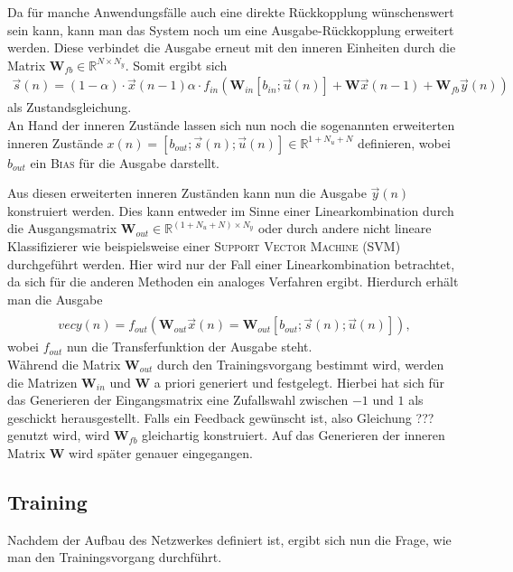 Da für manche Anwendungsfälle auch eine direkte Rückkopplung wünschenswert sein kann, kann man das System noch um eine Ausgabe-Rückkopplung erweitert werden. Diese verbindet die Ausgabe erneut mit den inneren Einheiten durch die Matrix $\mathbf{W}_{fb} \in \mathbb{R}^{N \times N_y}$.
Somit ergibt sich 
\begin{align}
\vec{s}(n) = (1 - \alpha) \cdot \vec{x}(n-1)  \alpha \cdot f_{in}\left( \mathbf{W}_{in} [b_{in}; \vec{u}(n)] + \mathbf{W} \vec{x}(n-1) + \mathbf{W}_{fb} \vec{y}(n) \right)
\end{align}
als Zustandsgleichung.\\

An Hand der inneren Zustände lassen sich nun noch die sogenannten erweiterten inneren Zustände $x(n) = [b_{out}; \vec{s}(n); \vec{u}(n)] \in \mathbb{R}^{1 + N_u + N}$ definieren, wobei $b_{out}$ ein \textsc{Bias} für die Ausgabe darstellt. 

Aus diesen erweiterten inneren Zuständen kann nun die Ausgabe $\vec{y}(n)$ konstruiert werden. Dies kann entweder im Sinne einer Linearkombination durch die Ausgangsmatrix $\mathbf{W}_{out} \in \mathbb{R}^{(1 + N_u + N) \times N_y}$ oder durch andere nicht lineare Klassifizierer wie beispielsweise einer \textsc{Support Vector Machine (SVM)} durchgeführt werden. Hier wird nur der Fall einer Linearkombination betrachtet, da sich für die anderen Methoden ein analoges Verfahren ergibt.
Hierdurch erhält man die Ausgabe
\begin{align}
\\vec{y}(n) = f_{out} \left( \mathbf{W}_{out} \vec{x}(n) = \mathbf{W}_{out} [b_{out}; \vec{s}(n); \vec{u}(n)] \right),
\end{align}
wobei $f_{out}$ nun die Transferfunktion der Ausgabe steht.\\

Während die Matrix $\mathbf{W}_{out}$ durch den Trainingsvorgang bestimmt wird, werden die Matrizen $\mathbf{W}_{in}$ und $\mathbf{W}$ a priori generiert und festgelegt. Hierbei hat sich für das Generieren der Eingangsmatrix eine Zufallswahl zwischen $-1$ und $1$ als geschickt herausgestellt. Falls ein Feedback gewünscht ist, also Gleichung ??? genutzt wird, wird $\mathbf{W}_{fb}$ gleichartig konstruiert. Auf das Generieren der inneren Matrix $\mathbf{W}$ wird später genauer eingegangen.

\subsection{Training}
Nachdem der Aufbau des Netzwerkes definiert ist, ergibt sich nun die Frage, wie man den Trainingsvorgang durchführt.

